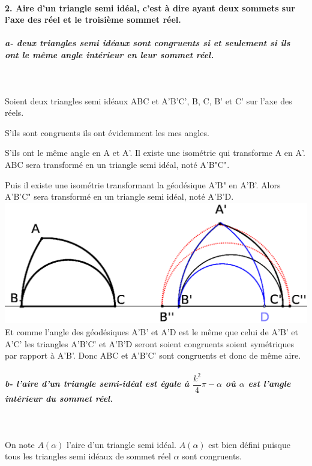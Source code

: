 \documentclass[a4paper, 12pt, twoside]{book}
\begin{document}
  \paragraph{ 2. Aire d'un triangle semi idéal, c'est à dire ayant deux sommets sur l'axe des réel et le troisième sommet réel.}
  
  \subparagraph{a- deux triangles semi idéaux sont congruents si et seulement si ils ont le même angle intérieur en leur sommet réel. }\
  
  
  Soient deux triangles semi idéaux ABC et A'B'C', B, C, B' et C' sur l'axe des réels.\
  
  S'ils sont congruents ils ont évidemment les mes angles.\
  
  S'ils ont le même angle en A et A'. Il existe une isométrie qui transforme A en A'. ABC sera transformé en un triangle semi idéal, noté  A'B"C".\
  
  Puis il existe une isométrie transformant la géodésique A'B" en A'B'. Alors A'B'C" sera transformé en un triangle semi idéal, noté  A'B'D.\\
  
\includegraphics[scale=0.7]{figures/hyper24bis.eps} \\ 
  
  
   Et comme l'angle des géodésiques	A'B' et A'D est le même que celui de A'B' et A'C' les  triangles A'B'C' et A'B'D seront soient congruents soient symétriques par rapport à A'B'. Donc ABC et A'B'C' sont congruents et donc de même aire.\\
  
  \subparagraph{b- l'aire d'un triangle semi-idéal est égale à $\dfrac{k^{2}}{4} \pi-\alpha$ où $\alpha$ est l'angle intérieur du sommet réel.}\
  
  
  
  On note $A(\alpha)$ l'aire d'un triangle semi idéal. $A(\alpha)$ est bien défini puisque tous les triangles semi idéaux de sommet réel $\alpha$ sont congruents.\\
  
\end{document}
